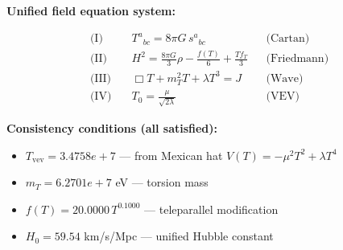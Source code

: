
\textbf{Unified field equation system:}

\begin{align}
  \text{(I)} \quad & T^a{}_{bc} = 8\pi G \, s^a{}_{bc} && \text{(Cartan)} \\
  \text{(II)} \quad & H^2 = \frac{8\pi G}{3}\rho - \frac{f(T)}{6} + \frac{Tf_T}{3} && \text{(Friedmann)} \\
  \text{(III)} \quad & \Box T + m_T^2 T + \lambda T^3 = J && \text{(Wave)} \\
  \text{(IV)} \quad & T_0 = \frac{\mu}{\sqrt{2\lambda}} && \text{(VEV)}
\end{align}

\textbf{Consistency conditions (all satisfied):}
\begin{itemize}
  \item $T_{\text{vev}} = 3.4758e+7$ — from Mexican hat $V(T) = -\mu^2 T^2 + \lambda T^4$
  \item $m_T = 6.2701e+7$ eV — torsion mass
  \item $f(T) = 20.0000 \, T^{0.1000}$ — teleparallel modification
  \item $H_0 = 59.54$ km/s/Mpc — unified Hubble constant
\end{itemize}